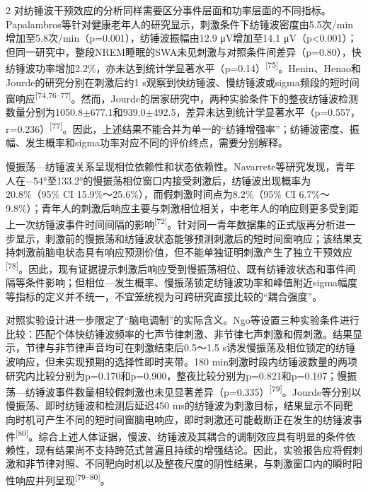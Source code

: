 \documentclass[UTF8,zihao=5,fontset=none]{ctexart}
\newcommand{\hei}{\CJKfamily{hei}}
\newcommand{\leveltwo}[1]{%
  \par\noindent{\hei\fontsize{10.5pt}{15.6pt}\selectfont\bfseries #1\par}}
\newcommand{\refcite}[1]{\nolinebreak[4]\textsuperscript{[#1]}}
\begin{document}
\begin{multicols}{2}
对纺锤波干预效应的分析同样需要区分事件层面和功率层面的不同指标。Papalambros等针对健康老年人的研究显示，刺激条件下纺锤波密度由5.5次/min增加至5.8次/min（p=0.001），纺锤波振幅由12.9 μV增加至14.1 μV（p<0.001）；但同一研究中，整段NREM睡眠的SWA未见刺激与对照条件间差异（p=0.80），快纺锤波功率增加2.2\%，亦未达到统计学显著水平（p=0.14）\refcite{75}。Henin、Henao和Jourde的研究分别在刺激后约1 s观察到快纺锤波、慢纺锤波或sigma频段的短时间窗响应\refcite{74,76--77}。然而，Jourde的居家研究中，两种实验条件下的整夜纺锤波检测数量分别为1050.8$\pm$677.1和939.0$\pm$492.5，差异未达到统计学显著水平（p=0.557，r=0.236）\refcite{77}。因此，上述结果不能合并为单一的“纺锤增强率”；纺锤波密度、振幅、发生概率和sigma功率对应不同的评价终点，需要分别解释。\par

慢振荡—纺锤波关系呈现相位依赖性和状态依赖性。Navarrete等研究发现，青年人在−54°至133.2°的慢振荡相位窗口内接受刺激后，纺锤波出现概率为20.8\%（95\% CI 15.9\%～25.6\%），而假刺激时间点为8.2\%（95\% CI 6.7\%～9.8\%）；青年人的刺激后响应主要与刺激相位相关，中老年人的响应则更多受到距上一次纺锤波事件时间间隔的影响\refcite{72}。针对同一青年数据集的正式版再分析进一步显示，刺激前的慢振荡和纺锤波状态能够预测刺激后的短时间窗响应；该结果支持刺激前脑电状态具有响应预测价值，但不能单独证明刺激产生了独立干预效应\refcite{78}。因此，现有证据提示刺激后响应受到慢振荡相位、既有纺锤波状态和事件间隔等条件影响；但相位—发生概率、慢振荡锁定纺锤波功率和峰值附近sigma幅度等指标的定义并不统一，不宜笼统视为可跨研究直接比较的“耦合强度”。\par

对照实验设计进一步限定了“脑电调制”的实际含义。Ngo等设置三种实验条件进行比较：匹配个体快纺锤波频率的七声节律刺激、非节律七声刺激和假刺激。结果显示，节律与非节律声音均可在刺激结束后0.5～1.5 s诱发慢振荡及相位锁定的纺锤波响应，但未实现预期的选择性即时夹带。180 min刺激时段内纺锤波数量的两项研究内比较分别为p=0.170和p=0.900，整夜比较分别为p=0.821和p=0.107；慢振荡—纺锤波事件数量相较假刺激也未见显著差异（p=0.335）\refcite{79}。Jourde等分别以慢振荡、即时纺锤波和检测后延迟450 ms的纺锤波为刺激目标，结果显示不同靶向时机可产生不同的短时间窗脑电响应，即时刺激还可能截断正在发生的纺锤波事件\refcite{80}。综合上述人体证据，慢波、纺锤波及其耦合的调制效应具有明显的条件依赖性，现有结果尚不支持跨范式普遍且持续的增强结论。因此，实验报告应将假刺激和非节律对照、不同靶向时机以及整夜尺度的阴性结果，与刺激窗口内的瞬时阳性响应并列呈现\refcite{79--80}。\par

\leveltwo{3.3 记忆巩固与认知收益的疗效证据及争议}


\end{multicols}
\end{document}
